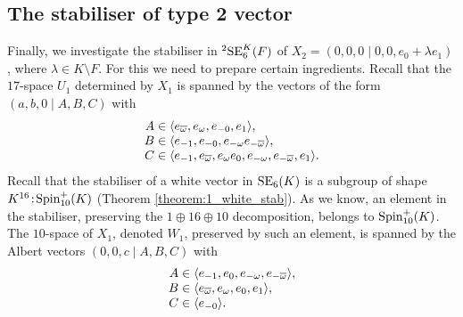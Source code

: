 \subsection{The stabiliser of type 2 vector}

Finally, we investigate the stabiliser in ${}^2\mathrm{SE}_6^K(F)$ of 
\mbox{$X_2 = (0,0,0 \mid 0,0,e_0 + \lambda e_1)$}, where $\lambda \in K \setminus F$. 
For this we need to prepare certain ingredients. 
Recall that the $17$-space $U_1$ determined by $X_1$ is spanned by the vectors of the form
$(a,b,0\mid A,B,C)$ with 
\begin{equation}
	\begin{array}{r@{\;}c@{\;}l}
		A & \in & \langle e_{\bar{\omega}}, e_{\omega}, e_{-0}, e_{1} \rangle, \\
		B & \in & \langle e_{-1}, e_{-0}, e_{-\omega} e_{-\bar{\omega}} \rangle, \\
		C & \in & \langle e_{-1}, e_{\bar{\omega}}, e_{\omega} e_0, 
					e_{-\omega}, e_{-\bar{\omega}}, e_{1} \rangle. 
	\end{array}
\end{equation}
Recall that the stabiliser of a white vector in $\mathrm{SE}_6(K)$ is a subgroup of shape 
$K^{16}\mathord{{\;\!{:}\;\!}}\mathrm{Spin}_{10}^+(K)$ (Theorem \ref{theorem:1_white_stab}). As we know, an element
in the stabiliser, preserving the $1\oplus 16 \oplus 10$ decomposition, belongs to 
$\mathrm{Spin}_{10}^+(K)$. The $10$-space of $X_1$, denoted $W_1$, 
preserved by such an element, is spanned by the
Albert vectors $(0,0,c \mid A,B,C)$ with
\begin{equation}
	\begin{array}{r@{\;}c@{\;}l}
		A & \in & \langle e_{-1}, e_0, e_{-\omega}, e_{-\bar{\omega}} \rangle, \\
		B & \in & \langle e_{\bar{\omega}}, e_{\omega}, e_0, e_1 \rangle, \\
		C & \in & \langle e_{-0} \rangle.
	\end{array}
\end{equation}

